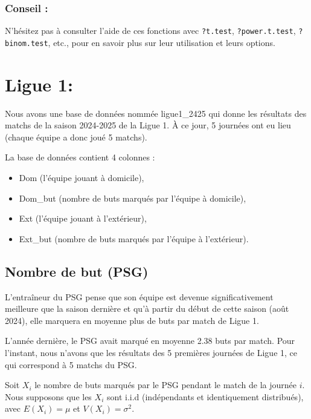 \documentclass[
]{article}
\providecommand{\tightlist}{%
  \setlength{\itemsep}{0pt}\setlength{\parskip}{0pt}}
\begin{document}
\hypertarget{conseil}{%
\subsubsection{Conseil :}\label{conseil}}

N'hésitez pas à consulter l'aide de ces fonctions avec \texttt{?t.test},
\texttt{?power.t.test}, \texttt{?binom.test}, etc., pour en savoir plus
sur leur utilisation et leurs options.

\hypertarget{ligue-1}{%
\section{Ligue 1:}\label{ligue-1}}

Nous avons une base de données nommée ligue1\_2425 qui donne les
résultats des matchs de la saison 2024-2025 de la Ligue 1. À ce jour, 5
journées ont eu lieu (chaque équipe a donc joué 5 matchs).

La base de données contient 4 colonnes :

\begin{itemize}
\tightlist
\item
  Dom (l'équipe jouant à domicile),
\item
  Dom\_but (nombre de buts marqués par l'équipe à domicile),
\item
  Ext (l'équipe jouant à l'extérieur),
\item
  Ext\_but (nombre de buts marqués par l'équipe à l'extérieur).
\end{itemize}

\hypertarget{nombre-de-but-psg}{%
\subsection{Nombre de but (PSG)}\label{nombre-de-but-psg}}

L'entraîneur du PSG pense que son équipe est devenue significativement
meilleure que la saison dernière et qu'à partir du début de cette saison
(août 2024), elle marquera en moyenne plus de buts par match de Ligue 1.

L'année dernière, le PSG avait marqué en moyenne 2.38 buts par match.
Pour l'instant, nous n'avons que les résultats des 5 premières journées
de Ligue 1, ce qui correspond à 5 matchs du PSG.

Soit \(X_i\) le nombre de buts marqués par le PSG pendant le match de la
journée \(i\). Nous supposons que les \(X_i\) sont i.i.d (indépendants
et identiquement distribués), avec \(E(X_i) = \mu\) et
\(V(X_i) = \sigma^2\).
\end{document}
